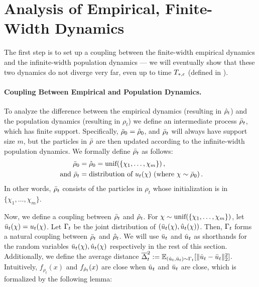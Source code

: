 \section{Analysis of Empirical, Finite-Width Dynamics}\label{section:finite_sample_analysis}

The first step is to set up a coupling between the finite-width empirical dynamics and the infinite-width population dynamics --- we will eventually show that these two dynamics do not diverge very far, even up to time $T_{*, \epsilon}$ (defined in ).

\paragraph{Coupling Between Empirical and Population Dynamics.} To analyze the difference between the empirical dynamics (resulting in ${\hat{\rho}}_t$) and the population dynamics (resulting in $\rho_t$) we define an intermediate process ${\bar{\rho}}_t$, which has finite support. Specifically, ${\bar{\rho}}_0 = {\hat{\rho}}_0$, and ${\bar{\rho}}_t$ will always have support size $m$, but the particles in ${\bar{\rho}}$ are then updated according to the infinite-width population dynamics. We formally define ${\bar{\rho}}_t$ as follows:
\begin{align}
{\bar{\rho}}_{0} & = {\hat{\rho}}_0 = \textup{unif}(\{\chi_1,\dots, \chi_m\}) \,, \nonumber\\
\text{ and } {\bar{\rho}}_t & = \textup{distribution of $u_t(\chi)$ (where $\chi \sim {\bar{\rho}}_0$)}  \,. \label{eqn:13}
\end{align}
In other words, ${\bar{\rho}}_t$ consists of the particles in $\rho_t$ whose initialization is in $\{\chi_1, \ldots, \chi_m\}$.

Now, we define a coupling between ${\bar{\rho}}_t$ and ${\hat{\rho}}_t$. For $\chi \sim \textup{unif}(\{\chi_1,\dots, \chi_m\})$, let $\bar{u}_t(\chi) = u_t(\chi)$. Let $\Gamma_t$ be the joint distribution of $(\bar{u}_t(\chi), \hat{u}_t(\chi))$. Then, $\Gamma_t$ forms a natural coupling between ${\bar{\rho}}_t$ and ${\hat{\rho}}_t$. We will use $\bar{u}_t$ and $\hat{u}_t$ as shorthands for the random variables  $\bar{u}_t(\chi), \hat{u}_t(\chi)$ respectively in the rest of this section. Additionally, we define the average distance $\overline{\Delta}_t^2 := \operatorname*{\mathbb{E}}_{(\hat{u}_t, \bar{u}_t)\sim \Gamma_t} [\|\hat{u}_t - \bar{u}_t\|_2^2]$. Intuitively, $f_{\rho_t}(x)$ and $f_{{\hat{\rho}}_t}(x)$ are close when $\hat{u}_t$ and $\bar{u}_t$ are close, which is formalized by the following lemma:

